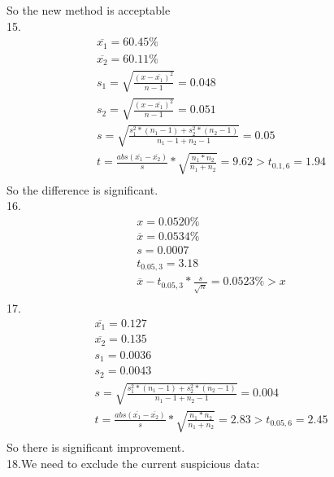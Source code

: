 \documentclass{article}
\begin{document}
So the new method is acceptable\\
15.\begin{equation}
    \begin{multlined}
        \overline{x_1} = 60.45\%\\
        \overline{x_2} = 60.11\%\\
        s_1 = \sqrt{\frac{\left(x - \overline{x_1}\right)^2}{n - 1}} = 0.048\\
        s_2 = \sqrt{\frac{\left(x - \overline{x_1}\right)^2}{n - 1}} = 0.051\\
        s = \sqrt{\frac{s_1^2*\left(n_1 - 1\right)+s_2^2*\left(n_2 - 1\right)}{n_1 - 1 + n_2 - 1}} = 0.05\\
        t = \frac{abs(\overline{x_1} - \overline{x_2})}{s}*\sqrt{\frac{n_1*n_2}{n_1+n_2}} = 9.62 > t_{0.1, 6} = 1.94\\
    \end{multlined}
\end{equation}
So the difference is significant.\\
16.\begin{equation}
    \begin{multlined}
        x = 0.0520\%\\
        \overline{x} = 0.0534\%\\
        s = 0.0007\\
        t_{0.05,3} = 3.18\\
        \overline{x} - t_{0.05,3}*\frac{s}{\sqrt{n}} = 0.0523\% > x\\
    \end{multlined}
\end{equation}
17.\begin{equation}
    \begin{multlined}
        \overline{x_1} = 0.127\\
        \overline{x_2} = 0.135\\
        s_1 = 0.0036\\
        s_2 = 0.0043\\
        s = \sqrt{\frac{s_1^2*\left(n_1 - 1\right)+s_2^2*\left(n_2 - 1\right)}{n_1 - 1 + n_2 - 1}} = 0.004\\
        t = \frac{abs(\overline{x_1} - \overline{x_2})}{s}*\sqrt{\frac{n_1*n_2}{n_1+n_2}} = 2.83 > t_{0.05, 6} = 2.45\\
    \end{multlined}
\end{equation}
So there is significant improvement.\\
18.We need to exclude the current suspicious data:\\
\end{document}
